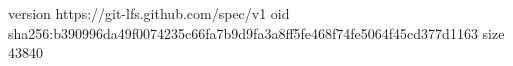 version https://git-lfs.github.com/spec/v1
oid sha256:b390996da49f0074235c66fa7b9d9fa3a8ff5fe468f74fe5064f45cd377d1163
size 43840
